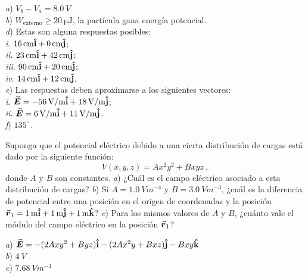 \begin{Answer}
	\begin{minipage}[t]{.4\textwidth}
    \textit{a}) $V_b-V_a = \SI{8.0}{V}$\\
    \textit{b}) $W_\text{externo} \geq \SI{20}{\micro\joule}$, la partícula gana energía potencial.\\
    \textit{d}) Estas son alguna respuestas posibles:\\
    \textit{i}. $\SI{16}{cm}\vu{i} + \SI{0}{cm}\vu{j}$;\\
    \textit{ii}. $\SI{23}{cm}\vu{i} + \SI{42}{cm}\vu{j}$;\\
    \textit{iii}. $\SI{90}{cm}\vu{i} + \SI{20}{cm}\vu{j}$;\\
    \textit{iv}. $\SI{14}{cm}\vu{i} + \SI{12}{cm}\vu{j}$.\\
    \textit{e}) Las respuestas deben aproximarse a los siguientes vectores:\\
    \textit{i}. $\va*{E} = \SI{-56}{V/m}\vu{i} +\SI{18}{V/m}\vu{j}$;\\
    \textit{ii}. $\va*{E} = \SI{6}{V/m}\vu{i} +\SI{11}{V/m}\vu{j}$.\\
    \textit{f}) $135^\circ\,.$ 
  \end{minipage}
\end{Answer}
%
\begin{Exercise}
  Suponga que el potencial eléctrico debido a una cierta distribución de cargas está dado por la siguiente función: \[V(x,y,z) = Ax^2y^2 + Bxyz~,\] donde $A$ y $B$ son constantes. \textit{a}) ¿Cuál es el campo eléctrico asociado a esta distribución de cargas? \textit{b}) Si $A = \SI{1.0}{Vm^{-4}}$ y $B = \SI{3.0}{Vm^{-3}}$, ¿cuál es la diferencia de potencial entre una posición en el origen de coordenadas y la posición $\va*{r}_1 =\SI{1}{\metre}\vu{i} + \SI{1}{\metre}\vu{j} + \SI{1}{\metre}\vu{k}$? \textit{c}) Para los mismos valores de $A$ y $B$,  ¿cuánto vale el módulo del campo eléctrico en la posición $\va*{r}_1$?
\end{Exercise}
\begin{Answer}
  \begin{minipage}[t]{.4\textwidth}
    \textit{a}) $\va*{E} = -(2Axy^2+Byz)\vu{i} -(2Ax^2y+Bxz)\vu{j}-Bxy\vu{k}$\\
    \textit{b}) $\SI{4}{V}$\\
    \textit{c}) $\SI{7.68}{Vm^{-1}}$
  \end{minipage}
\end{Answer}
%
